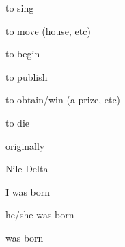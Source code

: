 \documentclass[avery5371,grid,frame]{flashcards}
\begin{document}
\begin{flashcard}{\LARGE to sing}
\LARGE {}
\end{flashcard}
\begin{flashcard}{\LARGE to move (house, etc)}
\LARGE {}
\end{flashcard}
\begin{flashcard}{\LARGE to begin}
\LARGE {}
\end{flashcard}
\begin{flashcard}{\LARGE to publish}
\LARGE {}
\end{flashcard}
\begin{flashcard}{\LARGE to obtain/win (a prize, etc)}
\LARGE {}
\end{flashcard}
\begin{flashcard}{\LARGE to die}
\LARGE {}
\end{flashcard}
\begin{flashcard}{\LARGE originally}
\LARGE {}
\end{flashcard}
\begin{flashcard}{\LARGE Nile Delta}
\LARGE {}
\end{flashcard}
\begin{flashcard}{\LARGE I was born}
\LARGE {}
\end{flashcard}
\begin{flashcard}{\LARGE he/she was born}
\LARGE {}
\end{flashcard}
\begin{flashcard}{\LARGE was born}
\LARGE {}
\end{flashcard}
\end{document}
